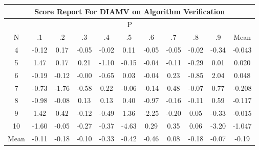 \documentclass[11pt,a4paper]{report}
\begin{document}
\begin{longtable}{ | c || c | c | c | c | c | c | c | c | c || c |}
\hline
\multicolumn{11}{|c|}{ Score Report For DIAMV on Algorithm Verification} \\
\hline
\multicolumn{11}{|c|}{ P } \\
\hline
N & .1 & .2 & .3 & .4 & .5 & .6 & .7 & .8 & .9 & Mean\\
 \hline
 \hline
 \endhead
  4 &  \cellcolor[HTML]{FFFFFF} -0.12 &  \cellcolor[HTML]{F7F7FF} 0.17 &  \cellcolor[HTML]{FFFFFF} -0.05 &  \cellcolor[HTML]{FFFFFF} -0.02 &  \cellcolor[HTML]{FFFFFF} 0.11 &  \cellcolor[HTML]{FFFFFF} -0.05 &  \cellcolor[HTML]{FFFFFF} -0.05 &  \cellcolor[HTML]{FFFFFF} -0.02 &  \cellcolor[HTML]{FFF7F7} -0.34 & -0.043 \\
  5 &  \cellcolor[HTML]{D7D7FF} 1.47 &  \cellcolor[HTML]{F7F7FF} 0.17 &  \cellcolor[HTML]{F7F7FF} 0.21 &  \cellcolor[HTML]{FFE7E7} -1.10 &  \cellcolor[HTML]{FFFFFF} -0.15 &  \cellcolor[HTML]{FFFFFF} -0.04 &  \cellcolor[HTML]{FFFFFF} -0.11 &  \cellcolor[HTML]{FFF7F7} -0.29 &  \cellcolor[HTML]{FFFFFF} 0.01 & 0.020 \\
  6 &  \cellcolor[HTML]{FFF7F7} -0.19 &  \cellcolor[HTML]{FFFFFF} -0.12 &  \cellcolor[HTML]{FFFFFF} -0.00 &  \cellcolor[HTML]{FFEFEF} -0.65 &  \cellcolor[HTML]{FFFFFF} 0.03 &  \cellcolor[HTML]{FFFFFF} -0.04 &  \cellcolor[HTML]{F7F7FF} 0.23 &  \cellcolor[HTML]{FFE7E7} -0.85 &  \cellcolor[HTML]{CFCFFF} 2.04 & 0.048 \\
  7 &  \cellcolor[HTML]{FFEFEF} -0.73 &  \cellcolor[HTML]{FFCFCF} -1.76 &  \cellcolor[HTML]{FFEFEF} -0.58 &  \cellcolor[HTML]{F7F7FF} 0.22 &  \cellcolor[HTML]{FFFFFF} -0.06 &  \cellcolor[HTML]{FFFFFF} -0.14 &  \cellcolor[HTML]{EFEFFF} 0.48 &  \cellcolor[HTML]{FFFFFF} -0.07 &  \cellcolor[HTML]{EFEFFF} 0.77 & -0.208 \\
  8 &  \cellcolor[HTML]{FFE7E7} -0.98 &  \cellcolor[HTML]{FFFFFF} -0.08 &  \cellcolor[HTML]{FFFFFF} 0.13 &  \cellcolor[HTML]{FFFFFF} 0.13 &  \cellcolor[HTML]{F7F7FF} 0.40 &  \cellcolor[HTML]{FFE7E7} -0.97 &  \cellcolor[HTML]{FFF7F7} -0.16 &  \cellcolor[HTML]{FFFFFF} -0.11 &  \cellcolor[HTML]{EFEFFF} 0.59 & -0.117 \\
  9 &  \cellcolor[HTML]{DFDFFF} 1.42 &  \cellcolor[HTML]{F7F7FF} 0.42 &  \cellcolor[HTML]{FFFFFF} -0.12 &  \cellcolor[HTML]{FFEFEF} -0.49 &  \cellcolor[HTML]{DFDFFF} 1.36 &  \cellcolor[HTML]{FFC7C7} -2.25 &  \cellcolor[HTML]{FFF7F7} -0.20 &  \cellcolor[HTML]{FFFFFF} 0.05 &  \cellcolor[HTML]{FFF7F7} -0.33 & -0.015 \\
  10 &  \cellcolor[HTML]{FFD7D7} -1.60 &  \cellcolor[HTML]{FFFFFF} -0.05 &  \cellcolor[HTML]{FFF7F7} -0.27 &  \cellcolor[HTML]{FFF7F7} -0.37 &  \cellcolor[HTML]{FF8787} -4.63 &  \cellcolor[HTML]{F7F7FF} 0.29 &  \cellcolor[HTML]{F7F7FF} 0.35 &  \cellcolor[HTML]{FFFFFF} 0.06 &  \cellcolor[HTML]{FFAFAF} -3.20 & -1.047 \\
 \hline
 \hline
Mean &  \cellcolor[HTML]{FFFFFF} -0.11 &  \cellcolor[HTML]{FFF7F7} -0.18 &  \cellcolor[HTML]{FFFFFF} -0.10 &  \cellcolor[HTML]{FFF7F7} -0.33 &  \cellcolor[HTML]{FFF7F7} -0.42 &  \cellcolor[HTML]{FFF7F7} -0.46 &  \cellcolor[HTML]{FFFFFF} 0.08 &  \cellcolor[HTML]{FFF7F7} -0.18 &  \cellcolor[HTML]{FFFFFF} -0.07 &  \cellcolor[HTML]{FFF7F7} -0.19
\end{longtable}
\end{document}
